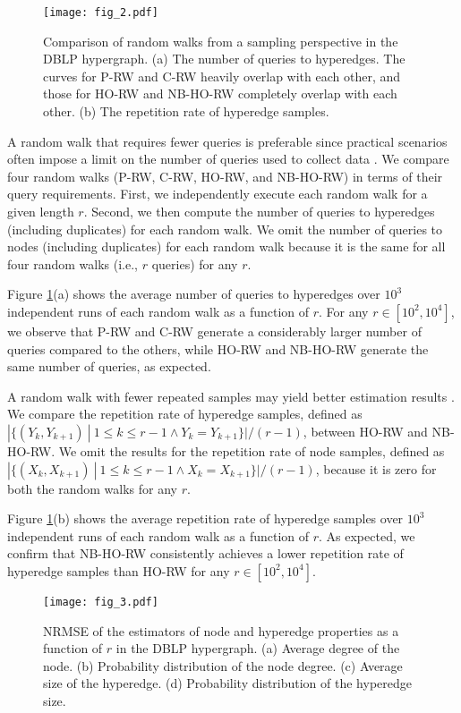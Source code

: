 \begin{figure}[t]
    \centering
    \texttt{[image: fig\_2.pdf]}\\
    \caption{Comparison of random walks from a sampling perspective in the DBLP hypergraph. (a) The number of queries to hyperedges. The curves for P-RW and C-RW heavily overlap with each other, and those for HO-RW and NB-HO-RW completely overlap with each other. (b) The repetition rate of hyperedge samples.}
\label{fig:2}
\end{figure}

A random walk that requires fewer queries is preferable since practical scenarios often impose a limit on the number of queries used to collect data \cite{gjoka2011, hardiman2013}.
We compare four random walks (P-RW, C-RW, HO-RW, and NB-HO-RW) in terms of their query requirements.
First, we independently execute each random walk for a given length $r$.  
Second, we then compute the number of queries to hyperedges (including duplicates) for each random walk.
We omit the number of queries to nodes (including duplicates) for each random walk because it is the same for all four random walks (i.e., $r$ queries) for any $r$.

Figure \ref{fig:2}(a) shows the average number of queries to hyperedges over $10^3$ independent runs of each random walk as a function of $r$.
For any $r \in [10^2, 10^4]$, we observe that P-RW and C-RW generate a considerably larger number of queries compared to the others, while HO-RW and NB-HO-RW generate the same number of queries, as expected.

A random walk with fewer repeated samples may yield better estimation results \cite{lee2012, li2015}.
We compare the repetition rate of hyperedge samples, defined as $|\{(Y_{k}, Y_{k+1})\ |\ 1 \leq k \leq r-1 \land Y_k = Y_{k+1}\} | / (r-1)$, between HO-RW and NB-HO-RW.
We omit the results for the repetition rate of node samples, defined as $|\{(X_{k}, X_{k+1})\ |\ 1 \leq k \leq r-1 \land X_k = X_{k+1}\} | / (r-1)$, because it is zero for both the random walks for any $r$.

Figure \ref{fig:2}(b) shows the average repetition rate of hyperedge samples over $10^3$ independent runs of each random walk as a function of $r$.
As expected, we confirm that NB-HO-RW consistently achieves a lower repetition rate of hyperedge samples than HO-RW for any $r \in [10^2, 10^4]$.

\begin{figure}[t]
    \centering
    \texttt{[image: fig\_3.pdf]}\\
    \caption{NRMSE of the estimators of node and hyperedge properties as a function of $r$ in the DBLP hypergraph. (a) Average degree of the node. (b) Probability distribution of the node degree. (c) Average size of the hyperedge. (d) Probability distribution of the hyperedge size.}
\label{fig:3}
\end{figure}

